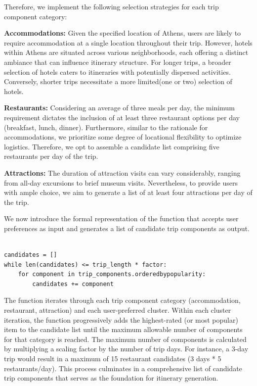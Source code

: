 \documentclass[12pt,a4paper]{report}
\begin{document}
Therefore, we implement the following selection strategies for each trip component category:
\begin{description}
\item{\textbf{Accommodations:}  Given the specified location of Athens, users are likely to require accommodation at a single location throughout their trip.  However, hotels within Athens are situated across various neighborhoods, each offering a distinct ambiance that can influence itinerary structure.  For longer trips, a broader selection of hotels caters to itineraries with potentially dispersed activities.  Conversely, shorter trips necessitate a more limited(one or two) selection of hotels.}
\item{\textbf{Restaurants:}  Considering an average of three meals per day, the minimum requirement dictates the inclusion of at least three restaurant options per day (breakfast, lunch, dinner).  Furthermore, similar to the rationale for accommodations, we prioritize some degree of locational flexibility to optimize logistics.  Therefore, we opt to assemble a candidate list comprising five restaurants per day of the trip.}
\item{\textbf{Attractions:}  The duration of attraction visits can vary considerably, ranging from all-day excursions to brief museum visits.  Nevertheless, to provide users with ample choice, we aim to generate a list of at least four attractions per day of the trip.}
\end{description}
We now introduce the formal representation of the function that accepts user preferences as input and generates a list of candidate trip components as output.

\begin{lstlisting}[breaklines,breakatwhitespace,caption={Building Trip Component Candidates},label=Building Trip Component Candidates]

candidates = []
while len(candidates) <= trip_length * factor:
	for component in trip_components.orderedbypopularity:
		candidates += component 
\end{lstlisting}

The function iterates through each trip component category (accommodation, restaurant, attraction) and each user-preferred cluster.  Within each cluster iteration, the function progressively adds the highest-rated (or most popular) item to the candidate list until the maximum allowable number of components for that category is reached.  The maximum number of components is calculated by multiplying a scaling factor by the number of trip days.  For instance, a 3-day trip would result in a maximum of 15 restaurant candidates (3 days * 5 restaurants/day).  This process culminates in a comprehensive list of candidate trip components that serves as the foundation for itinerary generation.
\end{document}
